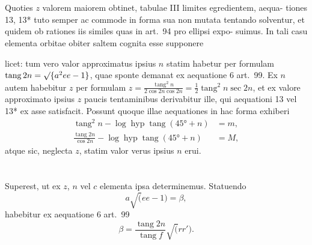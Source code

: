 \documentclass[12pt,a4paper]{article}
\newcommand{\tang}{\mathop{\mathrm{tang}}\nolimits}
\DeclareMathOperator{\hyp}{hyp}
\begin{document}
\section{}

Quoties $z$ valorem maiorem obtinet, tabulae III limites egredientem, aequa-
tiones 13, 13* tuto semper ac commode in forma sua non mutata tentando
solventur, et quidem ob rationes iis similes quas in art.~94 pro ellipsi expo-
suimus. In tali casu elementa orbitae obiter saltem cognita esse supponere

licet: tum vero valor approximatus ipsius $n$ statim habetur per formulam
$\tang 2n = \surd\{a^2 e e - 1\}$, quae sponte demanat ex aequatione 6 art.~99. Ex $n$ autem
habebitur $z$ per formulam $z = \frac{\tang^2 n}{2\cos 2n\cos 2n} = \frac{1}{2}\tang^2 n\sec 2n$, et ex valore approximato
ipsius $z$ paucis tentaminibus derivabitur ille, qui aequationi 13 vel 13* ex asse
satisfacit. Possunt quoque illae aequationes in hac forma exhiberi
\begin{align*}
\tang^2 n - \log\hyp\tang(45° + n) &= m, \\
\frac{\tang 2n}{\cos 2n} - \log\hyp\tang(45° + n) &= M,
\end{align*}
atque sic, neglecta $z$, statim valor verus ipsius $n$ erui.

\section{}

Superest, ut ex $z$, $n$ vel $c$ elementa ipsa determinemus. Statuendo
\[
a\surd(ee - 1) = \beta,
\]
habebitur ex aequatione 6 art.~99
\begin{equation}\tag{18}
\beta = \frac{\tang 2n}{\tang f}\surd(rr').
\end{equation}
\end{document}
